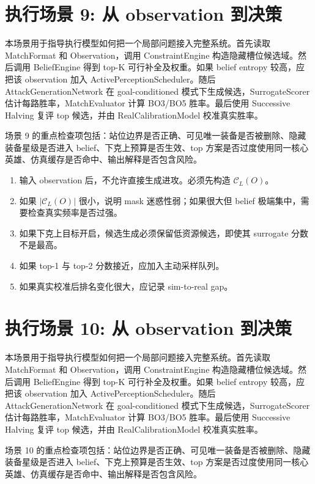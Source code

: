 \documentclass[UTF8,12pt,openany]{ctexbook}
\newcommand{\Ccal}{\mathcal{C}}
\begin{document}
\section{执行场景 9: 从 observation 到决策}
本场景用于指导执行模型如何把一个局部问题接入完整系统。首先读取 MatchFormat 和 Observation，调用 ConstraintEngine 构造隐藏槽位候选域。然后调用 BeliefEngine 得到 top-K 可行补全及权重。如果 belief entropy 较高，应把该 observation 加入 ActivePerceptionScheduler。随后 AttackGenerationNetwork 在 goal-conditioned 模式下生成候选，SurrogateScorer 估计每路胜率，MatchEvaluator 计算 BO3/BO5 胜率。最后使用 Successive Halving 复评 top 候选，并由 RealCalibrationModel 校准真实胜率。

场景 9 的重点检查项包括：站位边界是否正确、可见唯一装备是否被删除、隐藏装备星级是否进入 belief、下克上预算是否生效、top 方案是否过度使用同一核心英雄、仿真缓存是否命中、输出解释是否包含风险。

\begin{enumerate}[leftmargin=2em]
\item 输入 observation 后，不允许直接生成进攻。必须先构造 $\Ccal_L(O)$。
\item 如果 $|\Ccal_L(O)|$ 很小，说明 mask 迷惑性弱；如果很大但 belief 极端集中，需要检查真实频率是否过强。
\item 如果下克上目标开启，候选生成必须保留低资源候选，即使其 surrogate 分数不是最高。
\item 如果 top-1 与 top-2 分数接近，应加入主动采样队列。
\item 如果真实校准后排名变化很大，应记录 sim-to-real gap。
\end{enumerate}


\section{执行场景 10: 从 observation 到决策}
本场景用于指导执行模型如何把一个局部问题接入完整系统。首先读取 MatchFormat 和 Observation，调用 ConstraintEngine 构造隐藏槽位候选域。然后调用 BeliefEngine 得到 top-K 可行补全及权重。如果 belief entropy 较高，应把该 observation 加入 ActivePerceptionScheduler。随后 AttackGenerationNetwork 在 goal-conditioned 模式下生成候选，SurrogateScorer 估计每路胜率，MatchEvaluator 计算 BO3/BO5 胜率。最后使用 Successive Halving 复评 top 候选，并由 RealCalibrationModel 校准真实胜率。

场景 10 的重点检查项包括：站位边界是否正确、可见唯一装备是否被删除、隐藏装备星级是否进入 belief、下克上预算是否生效、top 方案是否过度使用同一核心英雄、仿真缓存是否命中、输出解释是否包含风险。
\end{document}
